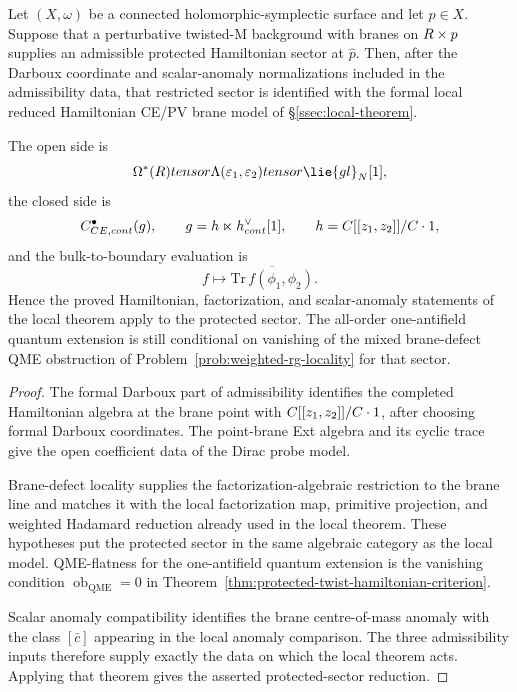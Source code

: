 \begin{prop}
  Let $(X,\omega)$ be a connected holomorphic-symplectic surface and
  let $p\in X$.  Suppose that a perturbative twisted-M background with
  branes on $R\times p$ supplies an admissible protected Hamiltonian
  sector at $\widehat p$.  Then, after the Darboux coordinate and
  scalar-anomaly normalizations included in the admissibility data, that
  restricted sector is identified with the formal local reduced Hamiltonian
  CE/PV brane model
  of \S\ref{ssec:local-theorem}.

  The open side is
  $$
  \Omega^*(\R)\otimes
  \Lambda(\varepsilon_1,\varepsilon_2)\otimes\lie{gl}_N[1],
  $$
  the closed side is
  $$
  C^\bullet_{CE,cont}(g),
  \qquad
  g=
  h\ltimes
  h^{\vee}_{cont}[1],
  \qquad
  h=C[[z_1,z_2]]/C\cdot 1,
  $$
  and the bulk-to-boundary evaluation is
  $$
  f\longmapsto
  \overline{\mathrm{Tr}\,f(\phi_1,\phi_2)}.
  $$
  Hence the proved Hamiltonian, factorization, and scalar-anomaly
  statements of the local theorem apply to the protected sector.  The
  all-order one-antifield quantum extension is still conditional on
  vanishing of the mixed brane-defect QME obstruction of
  Problem~\ref{prob:weighted-rg-locality} for that sector.
\end{prop}

\begin{proof}
  The formal Darboux part of admissibility identifies the completed
  Hamiltonian algebra at the brane point with
  $C[[z_1,z_2]]/C\cdot 1$, after choosing formal Darboux
  coordinates.  The point-brane Ext algebra and its cyclic trace give
  the open coefficient data of the Dirac probe model.

  Brane-defect locality supplies the factorization-algebraic
  restriction to the brane line and matches it with the local
  factorization map, primitive projection, and weighted Hadamard
  reduction already used in the local theorem.  These
  hypotheses put the protected sector in the same algebraic category
  as the local model.  QME-flatness for the one-antifield quantum
  extension is the vanishing condition
  \(\operatorname{ob}_{\mathrm{QME}}=0\) in
  Theorem~\ref{thm:protected-twist-hamiltonian-criterion}.

  Scalar anomaly compatibility identifies the brane centre-of-mass
  anomaly with the class $[\bar c]$ appearing in the local anomaly
  comparison.  The three admissibility inputs therefore supply exactly
  the data on which the local theorem acts.  Applying that theorem
  gives the asserted protected-sector reduction.
\end{proof}

